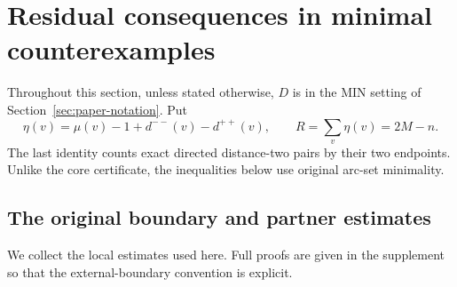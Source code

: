 \section{Residual consequences in minimal counterexamples}\label{sec:paper-residuals}
Throughout this section, unless stated otherwise, $D$ is in the MIN setting
of Section~\ref{sec:paper-notation}. Put
\[
 \eta(v)=\mu(v)-1+d^{--}(v)-d^{++}(v),\qquad
 R=\sum_v\eta(v)=2M-n.
\]
The last identity counts exact directed distance-two pairs by their two
endpoints. Unlike the core certificate, the inequalities below use original
arc-set minimality.

\subsection{The original boundary and partner estimates}
We collect the local estimates used here. Full proofs are given in the
supplement so that the external-boundary convention is explicit.

